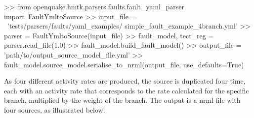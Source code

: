 \begin{python}[frame=single]
>> from openquake.hmtk.parsers.faults.fault_yaml_parser import\
    FaultYmltoSource
>> input_file = \
 'tests/parsers/faults/yaml_examples/
  simple_fault_example_4branch.yml'
>> parser = FaultYmltoSource(input_file) 
>> fault_model, tect_reg = parser.read_file(1.0)
>> fault_model.build_fault_model()
>> output_file  = 'path/to/output_source_model_file.yml'
>> fault_model.source_model.serialise_to_nrml(output_file,
                                              use_defaults=True)
\end{python}

As four different activity rates are produced, the source is duplicated four time, each with an activity rate that corresponds to the rate calculated for the specific branch, multiplied by the weight of the branch. The output is a nrml file with four sources, as illustrated below:

